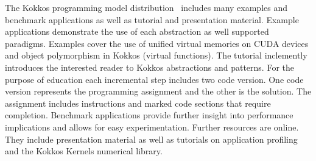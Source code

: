 
The Kokkos programming model distribution~\cite{KOKKOS_REPO} includes many examples and benchmark applications as well as tutorial and presentation material. Example applications demonstrate the use of each abstraction as well supported paradigms. Examples cover the use of unified virtual memories on CUDA devices and object polymorphism in Kokkos (virtual functions). The tutorial inclemently introduces the interested reader to Kokkos abstractions and patterns. For the purpose of education each incremental step includes two code version. One code version represents the programming assignment and the other is the solution. The assignment includes instructions and marked code sections that require completion. Benchmark applications provide further insight into performance implications and allows for easy experimentation. Further resources are online\cite{KOKKOS_TUTORIAL}. They include presentation material as well as tutorials on application profiling and the Kokkos Kernels numerical library.